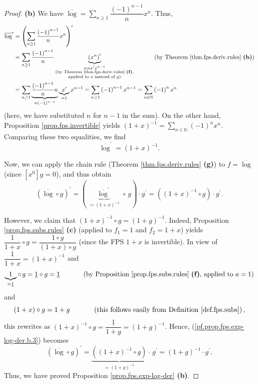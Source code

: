 \begin{proof}
\textbf{(b)} We have $\overline{\log}=\sum_{n\geq1}\dfrac{\left(  -1\right)
^{n-1}}{n}x^{n}$. Thus,
\begin{align*}
\overline{\log}^{\prime}  &  =\left(  \sum_{n\geq1}\dfrac{\left(  -1\right)
^{n-1}}{n}x^{n}\right)  ^{\prime}\\
&  =\sum_{n\geq1}\dfrac{\left(  -1\right)  ^{n-1}}{n}\underbrace{\left(
x^{n}\right)  ^{\prime}}_{\substack{=nx^{\prime}x^{n-1}\\\text{(by Theorem
\ref{thm.fps.deriv.rules} \textbf{(f)},}\\\text{applied to }x\text{ instead of
}g\text{)}}}\ \ \ \ \ \ \ \ \ \ \left(  \text{by Theorem
\ref{thm.fps.deriv.rules} \textbf{(b)}}\right) \\
&  =\sum_{n\geq1}\underbrace{\dfrac{\left(  -1\right)  ^{n-1}}{n}n}_{=\left(
-1\right)  ^{n-1}}\underbrace{x^{\prime}}_{=1}x^{n-1}=\sum_{n\geq1}\left(
-1\right)  ^{n-1}x^{n-1}=\sum_{n\in\mathbb{N}}\left(  -1\right)  ^{n}x^{n}%
\end{align*}
(here, we have substituted $n$ for $n-1$ in the sum). On the other hand,
Proposition \ref{prop.fps.invertible} yields $\left(  1+x\right)  ^{-1}%
=\sum_{n\in\mathbb{N}}\left(  -1\right)  ^{n}x^{n}$. Comparing these two
equalities, we find%
\begin{equation}
\overline{\log}^{\prime}=\left(  1+x\right)  ^{-1}.
\label{pf.prop.fps.exp-log-der.b.2}%
\end{equation}


Now, we can apply the chain rule (Theorem \ref{thm.fps.deriv.rules}
\textbf{(g)}) to $f=\overline{\log}$ (since $\left[  x^{0}\right]  g=0$), and
thus obtain%
\begin{equation}
\left(  \overline{\log}\circ g\right)  ^{\prime}=\left(  \underbrace{\overline
{\log}^{\prime}}_{=\left(  1+x\right)  ^{-1}}\circ\,g\right)  \cdot g^{\prime
}=\left(  \left(  1+x\right)  ^{-1}\circ g\right)  \cdot g^{\prime}.
\label{pf.prop.fps.exp-log-der.b.3}%
\end{equation}


However, we claim that $\left(  1+x\right)  ^{-1}\circ g=\left(  1+g\right)
^{-1}$. Indeed, Proposition \ref{prop.fps.subs.rules} \textbf{(c)} (applied to
$f_{1}=1$ and $f_{2}=1+x$) yields $\dfrac{1}{1+x}\circ g=\dfrac{1\circ
g}{\left(  1+x\right)  \circ g}$ (since the FPS $1+x$ is invertible). In view
of $\dfrac{1}{1+x}=\left(  1+x\right)  ^{-1}$ and
\[
\underbrace{1}_{=\underline{1}}\circ\,g=\underline{1}\circ g=\underline{1}%
\ \ \ \ \ \ \ \ \ \ \left(  \text{by Proposition \ref{prop.fps.subs.rules}
\textbf{(f)}, applied to }a=1\right)
\]
and%
\[
\left(  1+x\right)  \circ g=1+g\ \ \ \ \ \ \ \ \ \ \left(  \text{this follows
easily from Definition \ref{def.fps.subs}}\right)  ,
\]
this rewrites as $\left(  1+x\right)  ^{-1}\circ g=\dfrac{\underline{1}}%
{1+g}=\left(  1+g\right)  ^{-1}$. Hence, (\ref{pf.prop.fps.exp-log-der.b.3})
becomes%
\[
\left(  \overline{\log}\circ g\right)  ^{\prime}=\underbrace{\left(  \left(
1+x\right)  ^{-1}\circ g\right)  }_{=\left(  1+g\right)  ^{-1}}\cdot
\,g^{\prime}=\left(  1+g\right)  ^{-1}\cdot g^{\prime}.
\]
Thus, we have proved Proposition \ref{prop.fps.exp-log-der} \textbf{(b)}.
\end{proof}

